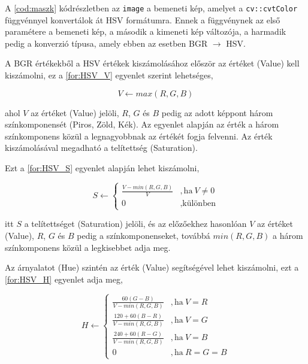\par A \ref{cod:maszk} kódrészletben az \lstinline{image} a bemeneti kép, amelyet a \lstinline{cv::cvtColor} függvénnyel \cite{opencv_docs} konvertálok át HSV formátumra. Ennek a függvénynek az első paramétere a bemeneti kép, a második a kimeneti kép változója, a harmadik pedig a konverzió típusa, amely ebben az esetben BGR $\rightarrow$ HSV.
\par A BGR értékekből a HSV értékek kiszámolásához először az értéket (Value) kell kiszámolni, ez a \ref{for:HSV_V} egyenlet\cite{opencv_docs} szerint lehetséges,

\begin{equation}
    V \leftarrow max(R,G,B)
    \label{for:HSV_V}
\end{equation}

\par ahol $V$ az értéket (Value) jelöli, $R$, $G$ és $B$ pedig az adott képpont három színkomponensét (Piros, Zöld, Kék). Az egyenlet alapján az érték a három színkomponens közül a legnagyobbnak az értékét fogja felvenni. Az érték kiszámolásával megadható a telítettség (Saturation).
\par Ezt a \ref{for:HSV_S} egyenlet\cite{opencv_docs} alapján lehet kiszámolni,

\begin{equation}
    S \leftarrow
    \begin{cases}
        \frac{V-min(R,G,B)}{V} & ,\text{ha}\ V\neq0 \\
        0 & ,\text{különben}
    \end{cases}
    \label{for:HSV_S}
\end{equation}

\par itt $S$ a telítettséget (Saturation) jelöli, és az előzőekhez hasonlóan $V$ az értéket (Value), $R$, $G$ és $B$ pedig a színkomponenseket, továbbá $min(R,G,B)$ a három színkomponens közül a legkisebbet adja meg.
\par Az árnyalatot (Hue) szintén az érték (Value) segítségével lehet kiszámolni, ezt a \ref{for:HSV_H} egyenlet\cite{opencv_docs} adja meg,

\begin{equation}
    H \leftarrow
    \begin{cases}
        \frac{60(G-B)}{V-min(R,G,B)} & ,\text{ha}\ V=R \\[5pt]
        \frac{120+60(B-R)}{V-min(R,G,B)} & ,\text{ha}\ V=G \\[5pt]
        \frac{240+60(R-G)}{V-min(R,G,B)} & ,\text{ha}\ V=B \\[5pt]
        0 & ,\text{ha}\ R=G=B
    \end{cases}
    \label{for:HSV_H}
\end{equation}

